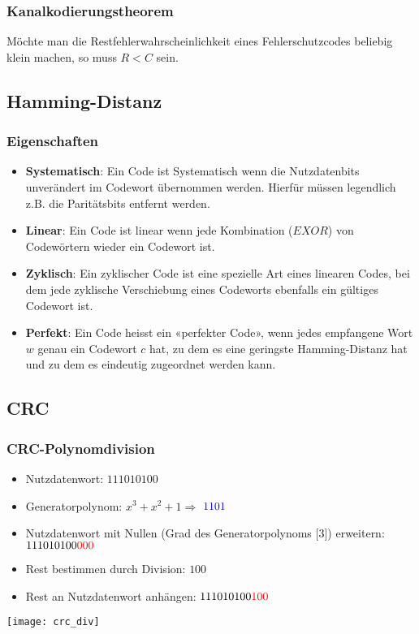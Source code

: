 \subsubsection{Kanalkodierungstheorem}
Möchte man die Restfehlerwahrscheinlichkeit eines Fehlerschutzcodes beliebig klein machen,
so muss $R < C$ sein.
\subsection{Hamming-Distanz}
\subsubsection{Eigenschaften}
\begin{itemize}
    \item \textbf{Systematisch}: Ein Code ist Systematisch wenn die Nutzdatenbits unverändert im Codewort übernommen werden.
    Hierfür müssen legendlich z.B. die Paritätsbits entfernt werden.
    \item \textbf{Linear}: Ein Code ist linear wenn jede Kombination ($EXOR$) von Codewörtern wieder ein Codewort ist.
    \item \textbf{Zyklisch}: Ein zyklischer Code ist eine spezielle Art eines linearen Codes, bei dem jede 
    zyklische Verschiebung eines Codeworts ebenfalls ein gültiges Codewort ist.
    \item \textbf{Perfekt}: Ein Code heisst ein «perfekter Code», wenn jedes empfangene Wort $w$
    genau ein Codewort $c$ hat, zu dem es eine geringste Hamming-Distanz
    hat und zu dem es eindeutig zugeordnet werden kann.
\end{itemize}
\subsection{CRC}
\subsubsection{CRC-Polynomdivision}
\begin{itemize}
    \item Nutzdatenwort: $111010100$
    \item Generatorpolynom: $x^3 + x^2 + 1 \Rightarrow$ $\textcolor{blue}{1101}$
    \item Nutzdatenwort mit Nullen (Grad des Generatorpolynoms [3]) erweitern: $111010100\textcolor{red}{000}$
    \item Rest bestimmen durch Division: $100$
    \item Rest an Nutzdatenwort anhängen: $111010100\textcolor{red}{100}$
\end{itemize}
\texttt{[image: crc\_div]}
